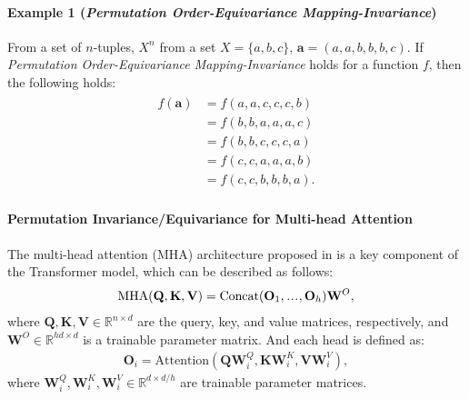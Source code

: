 \documentclass{article}
\newcommand{\poemi}{\emph{Permutation Order-Equivariance Mapping-Invariance}}
\newcommand\sdots{\makebox[1em][c]{.\hfil.\hfil.}}
\begin{document}
\paragraph{Example 1 (\poemi)}
From a set of $n$-tuples, $X^n$ from a set $X = \{a,b,c\}$, $\mathbf{a} = (a,a,b,b,b,c)$. If \emph{Permutation Order-Equivariance Mapping-Invariance} holds for a function $f$,
then the following holds:
\begin{align}
  \begin{split}
    f(\mathbf{a}) & = f(a,a,c,c,c,b) \\
                  & = f(b,b,a,a,a,c) \\
                  & = f(b,b,c,c,c,a) \\
                  & = f(c,c,a,a,a,b) \\
                  & = f(c,c,b,b,b,a).
  \end{split}
\end{align}

\paragraph{Permutation Invariance/Equivariance for Multi-head Attention}
The multi-head attention (MHA) architecture proposed in \cite{vaswani2017attention} is a key component of the Transformer model, which can be described as follows:
\begin{align}
  \text{MHA}(\mathbf{Q}, \mathbf{K}, \mathbf{V}) = \text{Concat}(\mathbf{O}_1, \sdots, \mathbf{O}_h) \mathbf{W}^O,
\end{align}
where $\mathbf{Q}, \mathbf{K}, \mathbf{V} \in \mathbb{R}^{n \times d}$ are the query, key, and value matrices, respectively,
and $\mathbf{W}^O \in \mathbb{R}^{hd \times d}$ is a trainable parameter matrix. And each head is defined as:
\begin{align}
  \mathbf{O}_i = \text{Attention}(\mathbf{Q} \mathbf{W}_i^Q, \mathbf{K} \mathbf{W}_i^K, \mathbf{V} \mathbf{W}_i^V),
\end{align}
where $\mathbf{W}_i^Q, \mathbf{W}_i^K, \mathbf{W}_i^V \in \mathbb{R}^{d \times d/h}$ are trainable parameter matrices.
\end{document}
